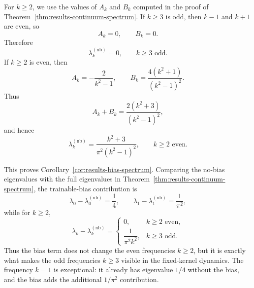 For \(k\ge 2\), we use the values of \(A_k\) and \(B_k\) computed in the proof of
Theorem~\ref{thm:results-continuum-spectrum}. If \(k\ge 3\) is odd, then \(k-1\) and \(k+1\)
are even, so
\[
	A_k=0,
	\qquad
	B_k=0.
\]
Therefore
\begin{equation}
	\lambda_k^{(\mathrm{nb})}=0,
	\qquad
	k\ge 3 \text{ odd}.
	\label{eq:app-no-bias-odd}
\end{equation}
If \(k\ge 2\) is even, then
\[
	A_k=-\frac{2}{k^2-1},
	\qquad
	B_k=\frac{4(k^2+1)}{(k^2-1)^2}.
\]
Thus
\[
	A_k+B_k
	=
	\frac{2(k^2+3)}{(k^2-1)^2},
\]
and hence
\begin{equation}
	\lambda_k^{(\mathrm{nb})}
	=
	\frac{k^2+3}{\pi^2(k^2-1)^2},
	\qquad
	k\ge 2 \text{ even}.
	\label{eq:app-no-bias-even}
\end{equation}

This proves Corollary~\ref{cor:results-bias-spectrum}. Comparing the no-bias eigenvalues with
the full eigenvalues in Theorem~\ref{thm:results-continuum-spectrum}, the trainable-bias
contribution is
\[
	\lambda_0-\lambda_0^{(\mathrm{nb})}
	=
	\frac14,
	\qquad
	\lambda_1-\lambda_1^{(\mathrm{nb})}
	=
	\frac{1}{\pi^2},
\]
while for \(k\ge 2\),
\[
	\lambda_k-\lambda_k^{(\mathrm{nb})}
	=
	\begin{cases}
		0,                   & k\ge 2 \text{ even}, \\[0.8em]
		\dfrac{1}{\pi^2k^2}, & k\ge 3 \text{ odd}.
	\end{cases}
\]
Thus the bias term does not change the even frequencies \(k\ge 2\), but it is exactly what makes
the odd frequencies \(k\ge 3\) visible in the fixed-kernel dynamics. The frequency \(k=1\) is
exceptional: it already has eigenvalue \(1/4\) without the bias, and the bias adds the additional
\(1/\pi^2\) contribution.
